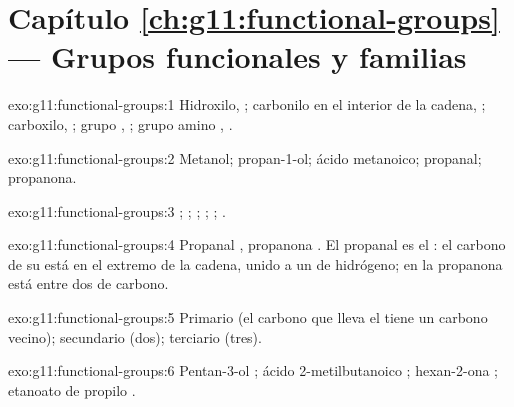 \section*{Capítulo \ref{ch:g11:functional-groups} --- Grupos funcionales y familias}

\begin{solution}{exo:g11:functional-groups:1}
Hidroxilo, ; carbonilo en el interior de la cadena, ;
carboxilo, ; grupo , ; grupo amino
, .
\end{solution}

\begin{solution}{exo:g11:functional-groups:2}
Metanol; propan-1-ol; ácido metanoico; propanal; propanona.
\end{solution}

\begin{solution}{exo:g11:functional-groups:3}
; ; ; ; ; .
\end{solution}

\begin{solution}{exo:g11:functional-groups:4}
Propanal , propanona . El propanal es el
: el carbono de su  está en el extremo de la cadena,
unido a un  de hidrógeno; en la propanona está entre dos  de
carbono.
\end{solution}

\begin{solution}{exo:g11:functional-groups:5}
Primario (el carbono que lleva el  tiene un carbono vecino);
secundario (dos); terciario (tres).
\end{solution}

\begin{solution}{exo:g11:functional-groups:6}
Pentan-3-ol ;
ácido 2-metilbutanoico ;
hexan-2-ona ;
etanoato de propilo .
\end{solution}

